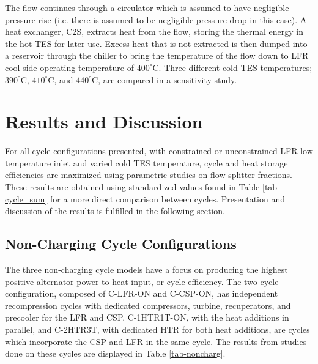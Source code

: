 \begin{paracol}{2}
\linenumbers
\switchcolumn

The flow continues through a circulator which is assumed to have negligible pressure rise (i.e. there is assumed to be negligible pressure drop in this case). A heat exchanger, C2S, extracts heat from the flow, storing the thermal energy in the hot TES for later use. Excess heat that is not extracted is then dumped into a reservoir through the chiller to bring the temperature of the flow down to LFR cool side operating temperature of $400^{\circ}$C. Three different cold TES temperatures; $390^{\circ}$C, $410^{\circ}$C, and $440^{\circ}$C, are compared in a sensitivity study. 



\section{Results and Discussion}

For all cycle configurations presented, with constrained or unconstrained LFR low temperature inlet and varied cold TES temperature, cycle and heat storage efficiencies are maximized using parametric studies on flow splitter fractions. These results are obtained using standardized values found in Table \ref{tab-cycle_sum} for a more direct comparison between cycles. Presentation and discussion of the results is fulfilled in the following section. 

\subsection{Non-Charging Cycle Configurations}

The three non-charging cycle models have a focus on producing the highest positive alternator power to heat input, or cycle efficiency. The two-cycle configuration, composed of C-LFR-ON and C-CSP-ON, has independent recompression cycles with dedicated compressors, turbine, recuperators, and precooler for the LFR and CSP. C-1HTR1T-ON, with the heat additions in parallel, and C-2HTR3T, with dedicated HTR for both heat additions, are cycles which incorporate the CSP and LFR in the same cycle. The results from studies done on these cycles are displayed in Table \ref{tab-noncharg}. 

\end{paracol}

